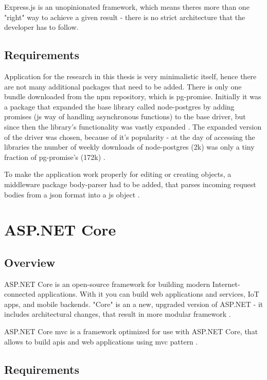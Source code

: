 Express.js is an unopinionated framework, which means theres more than one "right" way to achieve a given result - there is no strict architecture that the developer has to follow.

\subsection{Requirements}
Application for the research in this thesis is very minimalistic itself, hence there are not many additional packages that need to be added. There is only one bundle downloaded from the \acrshort{npm} repository, which is pg-promise. Initially it was a package that expanded the base library called node-postgres by adding promises (\acrlong{js} way of handling asynchronous functions) to the base driver, but since then the library's functionality was vastly expanded \cite{pgPromiseGit}.
The expanded version of the driver was chosen, because of it's popularity - at the day of accessing the libraries the number of weekly downloads of node-postgres (2k) \cite{nodePostgresNpm} was only a tiny fraction of pg-promise's (172k) \cite{pgPromiseNpm}.

To make the application work properly for editing or creating objects, a middleware package body-parser had to be added, that parses incoming request bodies from a \acrshort{json} format into a \acrshort{js} object \cite{bodyParser}.

\section{ASP.NET Core}

\subsection{Overview}
ASP.NET Core is an open-source framework for building modern Internet-connected applications. With it you can build web applications and services, IoT apps, and mobile backends. "Core" is an a new, upgraded version of ASP.NET - it includes architectural changes, that result in more modular framework \cite{aspnetIntroduction}.

ASP.NET Core \acrshort{mvc} is a framework optimized for use with ASP.NET Core, that allows to build \acrshort{api}s and web applications using \acrlong{mvc} pattern \cite{aspnetMvcOverview}.

\subsection{Requirements}

